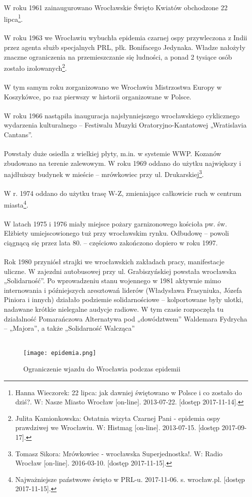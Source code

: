 \documentclass[12pt]{article}
\begin{document}
W roku 1961 zainaugurowano Wrocławskie Święto Kwiatów obchodzone 22 lipca\footnote{Hanna Wieczorek: 22 lipca: jak dawniej świętowano w Polsce i co zostało do dziś?. W: Nasze Miasto Wrocław [on-line]. 2013-07-22. [dostęp 2017-11-14].}.\\\\
W roku 1963 we Wrocławiu wybuchła epidemia czarnej ospy przywleczona z Indii przez agenta służb specjalnych PRL, płk. Bonifacego Jedynaka. Władze nałożyły znaczne ograniczenia na przemieszczanie się ludności, a ponad 2 tysiące osób zostało izolowanych\footnote{Julita Kamionkowska: Ostatnia wizyta Czarnej Pani - epidemia ospy prawdziwej we Wrocławiu. W: Histmag [on-line]. 2013-07-15. [dostęp 2017-09-17].}.\\\\
W tym samym roku zorganizowano we Wrocławiu Mistrzostwa Europy w Koszykówce, po raz pierwszy w historii organizowane w Polsce.\\\\
W roku 1966 nastąpiła inauguracja najsłynniejszego wrocławskiego cyklicznego wydarzenia kulturalnego – Festiwalu Muzyki Oratoryjno-Kantatowej „Wratislavia Cantans”.\\\\
Powstały duże osiedla z wielkiej płyty, m.in. w systemie WWP. Kozanów zbudowano na terenie zalewowym. W roku 1969 oddano do użytku największy i najdłuższy budynek w mieście – mrówkowiec przy ul. Drukarskiej\footnote{Tomasz Sikora: Mrówkowiec - wrocławska Superjednostka!. W: Radio Wrocław [on-line]. 2016-03-10. [dostęp 2017-11-15].}.\\\\
W r. 1974 oddano do użytku trasę W-Z, zmieniające całkowicie ruch w centrum miasta\footnote{Najważniejsze państwowe święto w PRL-u. 2017-11-06. s. wrocław.pl. [dostęp 2017-11-15].}.\\\\
W latach 1975 i 1976 miały miejsce pożary garnizonowego kościoła pw. św. Elżbiety umiejscowionego tuż przy wrocławskim rynku. Odbudowę – powoli ciągnącą się przez lata 80. – częściowo zakończono dopiero w roku 1997.\\\\
Rok 1980 przyniósł strajki we wrocławskich zakładach pracy, manifestacje uliczne. W zajezdni autobusowej przy ul. Grabiszyńskiej powstała wrocławska „Solidarność”. Po wprowadzeniu stanu wojennego w 1981 aktywnie mimo internowania i późniejszych aresztowań liderów (Władysława Frasyniuka, Józefa Piniora i innych) działało podziemie solidarnościowe – kolportowane były ulotki, nadawane krótkie nielegalne audycje radiowe. W tym czasie rozpoczęła tu działalność Pomarańczowa Alternatywa pod „dowództwem” Waldemara Fydrycha – „Majora”, a także „Solidarność Walcząca”\\\\
\begin{figure}[h]
    \centering
    \texttt{[image: epidemia.png]}
    \caption{Ograniczenie wjazdu do Wrocławia podczas epidemii}
    \label{fig:epidemia}
\end{figure}
\end{document}
